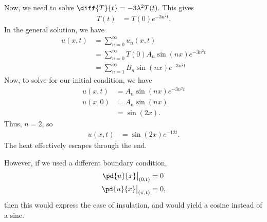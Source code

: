 \documentclass[10pt]{mypackage}
\begin{document}
\begin{example}
  Now, we need to solve $\diff{T}{t} = -3\lambda^2 T(t)$. This gives
  \begin{align*}
    T(t) &= T(0)e^{-3n^2 t}.
  \end{align*}
  In the general solution, we have
  \begin{align*}
    u\left( x,t \right) &= \sum_{n=0}^{\infty}u_n\left( x,t \right)\\
                        &= \sum_{n=0}^{\infty}T(0)A_n\sin\left( n x \right)e^{-3n^2t}\\
                        &= \sum_{n=1}^{\infty}B_n\sin\left( n x \right) e^{-3n^2 t}
  \end{align*}
  Now, to solve for our initial condition, we have
  \begin{align*}
    u\left( x,t \right) &= A_n\sin\left( n x \right)e^{-3n^2 t}\\
    u\left( x,0 \right) &= A_n\sin\left( n x \right)\\
                        &= \sin\left( 2x \right).
  \end{align*}
  Thus, $n = 2$, so
  \begin{align*}
    u\left( x,t \right) &= \sin\left( 2x \right)e^{-12 t}.
  \end{align*}
  The heat effectively escapes through the end.\newline

  However, if we used a different boundary condition,
  \begin{align*}
    \pd{u}{x}\bigr\vert_{(0,t)}  &= 0\\
    \pd{u}{x}\bigr\vert_{(\pi,t)} &= 0,
  \end{align*}
  then this would express the case of insulation, and would yield a cosine instead of a sine.
\end{example}
\end{document}
